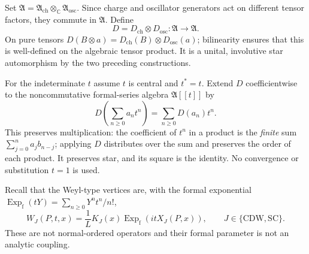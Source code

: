 Set $\mathfrak A=\mathfrak A_{\mathrm{ch}}\otimes_{\mathbb C}
\mathfrak A_{\mathrm{osc}}$.  Since charge and oscillator generators
act on different tensor factors, they commute in $\mathfrak A$.
Define
\begin{equation}
 D=D_{\mathrm{ch}}\otimes D_{\mathrm{osc}}:
  \mathfrak A\longrightarrow\mathfrak A.
 \label{eq:ch20c-Dtensor}
\end{equation}
On pure tensors $D(B\otimes a)=D_{\mathrm{ch}}(B)\otimes
D_{\mathrm{osc}}(a)$; bilinearity ensures that this is
well-defined on the algebraic tensor product.  It is a unital,
involutive star automorphism by the two preceding constructions.

For the indeterminate $t$ assume $t$ is central and $t^*=t$.
Extend $D$ coefficientwise to the noncommutative formal-series algebra
$\mathfrak A[[t]]$ by
\[
 D\left(\sum_{n\geq0}a_nt^n\right)
  =\sum_{n\geq0}D(a_n)t^n.
\]
This preserves multiplication: the coefficient of $t^n$ in a
product is the \emph{finite} sum
$\sum_{j=0}^{n}a_jb_{n-j}$; applying $D$ distributes over the
sum and preserves the order of each product.  It preserves star,
and its square is the identity.  No convergence or substitution
$t=1$ is used.

Recall that the Weyl-type vertices are, with the formal exponential
$\operatorname{Exp}_{\mathrm f}(tY)
=\sum_{n\geq0}Y^nt^n/n!$,
\begin{equation}
 W_J(P,t,x)=\frac1L K_J(x)
   \operatorname{Exp}_{\mathrm f}(itX_J(P,x)),
 \qquad J\in\{\mathrm{CDW},\mathrm{SC}\}.
 \label{eq:ch20c-W}
\end{equation}
These are not normal-ordered operators and their formal parameter
is not an analytic coupling.


